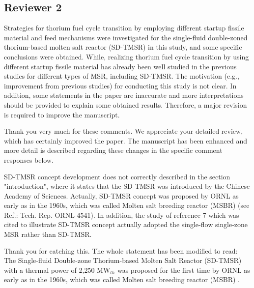 \documentclass[answers,11pt]{exam}
\begin{document}
\begin{questions}
        \section*{Reviewer 2}

        \question Strategies for thorium fuel cycle transition by employing different startup fissile material and feed mechanisms were investigated for the single-fluid double-zoned thorium-based molten salt reactor (SD-TMSR) in this study, and some specific conclusions were obtained. While, realizing thorium fuel cycle transition by using different startup fissile material has already been well studied in the previous studies for different types of MSR, including SD-TMSR. The motivation (e.g., improvement from previous studies) for conducting this study is not clear. In addition, some statements in the paper are inaccurate and more interpretations should be provided to explain some obtained results. Therefore, a major revision is required to improve the manuscript.
        
        \begin{solution}
                Thank you very much for these comments. We appreciate your detailed review, which has certainly improved the paper. The manuscript has been enhanced and more detail is described regarding these changes in the specific comment responses below.
        \end{solution}


        \question SD-TMSR concept development does not correctly described in the section "introduction", where it states that the SD-TMSR was introduced by the Chinese Academy of Sciences. Actually, SD-TMSR concept was proposed by ORNL as early as in the 1960s, which was called Molten salt breeding reactor (MSBR) (see Ref.: Tech. Rep. ORNL-4541). In addition, the study of reference 7 which was cited to illustrate SD-TMSR concept actually adopted the single-flow single-zone MSR rather than SD-TMSR.
        
        \begin{solution}
                 Thank you for catching this. The whole statement has been 
                 modified to read:\\
                 
                 The Single-fluid Double-zone Thorium-based Molten Salt Reactor (SD-TMSR) with a thermal power of 2,250
                 MW$_{th}$ was proposed for the first time by ORNL as early as in the 1960s, which was called Molten salt breeding reactor (MSBR) \cite{robertson_conceptual_1971}.
                 

\end{solution}
\end{questions}
\end{document}
